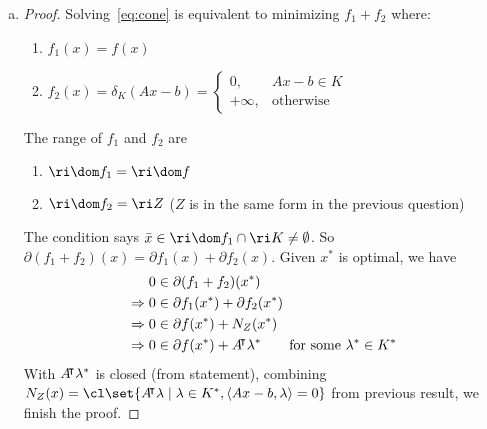 \documentclass{article}
\begin{document}
\begin{solution}
\begin{enumerate}[(a)]
{\begin{proof}
                We conclude that
                \[ \text{ri}\, Z \supseteq \{x \in \mathbb{R}^n \mid Ax - b \in \text{ri}\, K\}. \]
            \end{proof}
        }
        \item {
            \begin{proof}
                Solving~\cref{eq:cone} is equivalent to minimizing $f_1+f_2$ where:
                \begin{enumerate}
                    \item $f_1(x)=f(x)$
                    \item $f_2(x)=\delta_K(Ax-b)=\begin{cases}
                        0, & Ax-b\in K \\
                        +\infty, & \text{otherwise}
                    \end{cases}$
                \end{enumerate}
                The range of $f_1$ and $f_2$ are
                \begin{enumerate}
                    \item $\ri\dom f_1=\ri\dom f$
                    \item $\ri\dom f_2=\ri Z$ ($Z$ is in the same form in the previous question)
                \end{enumerate}
                The condition says $\bar{x}\in\ri\dom f_1\cap\ri K\neq\emptyset$. So $\partial(f_1+f_2)(x)=\partial f_1(x)+\partial f_2(x)$. Given $x^*$ is optimal, we have
                \begin{align*}
                    0& \in\partial(f_1+f_2)(x^*) \\
                    \Rightarrow
                    0& \in\partial f_1(x^*)+\partial f_2(x^*) \\
                    \Rightarrow
                    0& \in\partial f(x^*)+N_Z(x^*) \\
                    \Rightarrow
                    0& \in\partial f(x^*)+A{}^{\mkern-4mu\intercal}\lambda^* \qquad \text{for some }\lambda^*\in K^*
                \end{align*}
                With $A{}^{\mkern-4mu\intercal}\lambda^*$ is closed (from statement), combining $N_Z(x)=\cl\set{A\trn\lambda\mid\lambda\in K^*,\angles{Ax-b,\lambda}=0}$ from previous result, we finish the proof.
            \end{proof}
        }
    \end{enumerate}
\end{solution}
\end{document}
